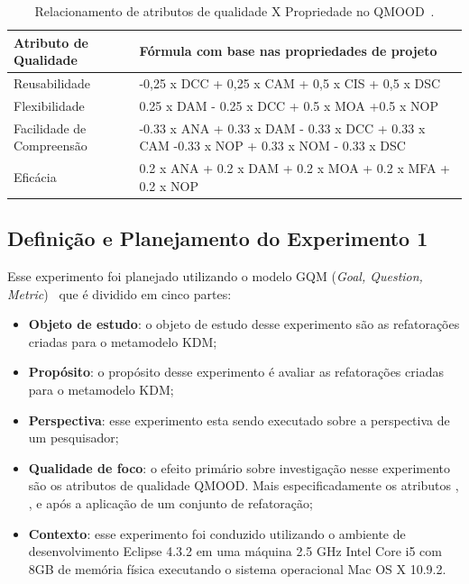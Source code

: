 \begin{table}[!h]
\caption{Relacionamento de atributos de qualidade X Propriedade no QMOOD~\cite{Bansiya_QMOOD}.}
\label{tab:QMOOD_quality_metrics2}
\begin{center}
\begin{tabular}{ | m{4cm} | m{10cm} |} 
\hline
Atributo de Qualidade & Fórmula com base nas propriedades de projeto  \\ 
\hline
Reusabilidade & -0,25 x DCC + 0,25 x CAM + 0,5 x CIS + 0,5 x DSC  \\ 
\hline
Flexibilidade & 0.25 x DAM - 0.25 x DCC + 0.5 x MOA +0.5 x NOP \\
\hline
Facilidade de Compreensão & -0.33 x ANA + 0.33 x DAM - 0.33 x DCC + 0.33 x CAM -0.33 x NOP + 0.33 x NOM - 0.33 x DSC \\ 
\hline
Eficácia & 0.2 x ANA + 0.2 x DAM + 0.2 x MOA + 0.2 x MFA + 0.2 x NOP \\ 
\hline
\end{tabular}
\end{center}
\end{table}

\subsection{Definição e Planejamento do Experimento 1}

Esse experimento foi planejado utilizando o modelo GQM (\textit{Goal, Question, Metric})~\cite{Wohlin} que é dividido em cinco partes: 

\begin{itemize}
\item \textbf{Objeto de estudo}: o objeto de estudo desse experimento são as refatorações criadas para o metamodelo KDM;
\item \textbf{Propósito}: o propósito desse experimento é avaliar as refatorações criadas para o metamodelo KDM;
\item \textbf{Perspectiva}: esse experimento esta sendo executado sobre a perspectiva de um pesquisador;
\item \textbf{Qualidade de foco}: o efeito primário sobre investigação nesse experimento são os atributos de qualidade QMOOD. Mais especificadamente os atributos , ,  e  após a aplicação de um conjunto de refatoração;
\item \textbf{Contexto}: esse experimento foi conduzido utilizando o ambiente de desenvolvimento Eclipse 4.3.2 em uma máquina 2.5 GHz Intel Core i5 com 8GB de memória física executando o sistema operacional Mac OS X 10.9.2.
\end{itemize}


